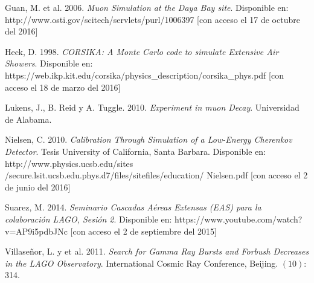 \documentclass{book}
\begin{document}
\begin{thebibliography}{9}
 Guan, M. et al. 2006.  \textit{Muon Simulation at the Daya Bay site}. Disponible en: \\http://www.osti.gov/scitech/servlets/purl/1006397 [con acceso el 17 de octubre del 2016]

 Heck, D. 1998. \textit{CORSIKA: A Monte Carlo code to simulate Extensive Air Showers}. Disponible en: https://web.ikp.kit.edu/corsika/physics\_description/corsika\_phys.pdf [con acceso el 18 de marzo del 2016]

 Lukens, J., B. Reid y A. Tuggle.  2010. \textit{Experiment in muon Decay}. Universidad de Alabama.

 Nielsen, C.  2010. \textit{Calibration Through Simulation of a Low-Energy Cherenkov Detector}. Tesis University of California, Santa Barbara. Disponible en: http://www.physics.ucsb.edu/sites\\/secure.lsit.ucsb.edu.phys.d7/files/sitefiles/education/ Nielsen.pdf [con acceso el 2 de junio del 2016]

 Suarez, M. 2014. \textit{Seminario Cascadas A\'ereas Extensas (EAS) para la colaboraci\'on LAGO, Sesi\'on 2}. Disponible en: https://www.youtube.com/watch?v=AP9i5pdbJNc [con acceso el 2 de septiembre del 2015]

 Villase\~nor, L. y et al. 2011. \textit{Search for Gamma Ray Bursts and Forbush Decreases in the LAGO Observatory}. International Cosmic Ray Conference, Beijing. $(10)$: 314.


\end{thebibliography}



\end{document}
